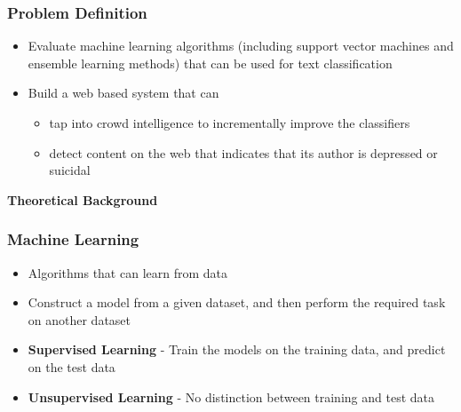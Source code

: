 \documentclass{beamer}
\begin{document}
    \begin{frame}
        \frametitle{Problem Definition}
        \begin{itemize}
            \item{Evaluate machine learning algorithms (including support vector machines and ensemble learning methods) that can be used for text classification}
            \item{
            Build a web based system that can
            \begin{itemize}
                \item{tap into crowd intelligence to incrementally improve the classifiers}
                \item{detect content on the web that indicates that its author is depressed or suicidal}
            \end{itemize}
            }
        \end{itemize}
    \end{frame}
    
    \begin{frame}
        \begin{center}
            \textbf{Theoretical Background}
        \end{center}
    \end{frame}
    
    \begin{frame}
        \frametitle{Machine Learning}
        \begin{itemize}
            \item{Algorithms that can learn from data}
            \item{Construct a model from a given dataset, and then perform the required task on another dataset}
            \item{\textbf{Supervised Learning} - Train the models on the training data, and predict on the test data}
            \item{\textbf{Unsupervised Learning} - No distinction between training and test data}
        \end{itemize}
    \end{frame}
    
\end{document}
